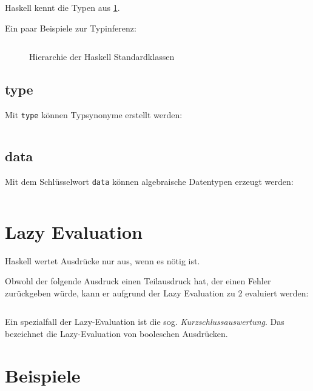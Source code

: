 Haskell kennt die Typen aus \cref{fig:haskell-type-hierarchy}.

Ein paar Beispiele zur Typinferenz:
\inputminted[numbersep=5pt, tabsize=4]{haskell}{scripts/haskell/typinferenz.sh}

\begin{figure}[htp]
    \centering
    \resizebox{0.9\linewidth}{!}{}
    \caption{Hierarchie der Haskell Standardklassen}
    \label{fig:haskell-type-hierarchy}
\end{figure}

\subsection{type}%
Mit \texttt{type} können Typsynonyme erstellt werden:

\inputminted[numbersep=5pt, tabsize=4]{haskell}{scripts/haskell/alt-types.hs}

\subsection{data}%
Mit dem Schlüsselwort \texttt{data} können algebraische Datentypen
erzeugt werden:

\inputminted[numbersep=5pt, tabsize=4]{haskell}{scripts/haskell/data-example.hs}

\section{Lazy Evaluation}
Haskell wertet Ausdrücke nur aus, wenn es nötig ist.

\begin{beispiel}
    Obwohl der folgende Ausdruck einen Teilausdruck hat, der einen Fehler zurückgeben
    würde, kann er aufgrund der Lazy Evaluation zu 2 evaluiert werden:
    \inputminted[linenos, numbersep=5pt, tabsize=4, frame=lines, label=lazy-evaluation.hs]{haskell}{scripts/haskell/lazy-evaluation.hs}
\end{beispiel}

Ein spezialfall der Lazy-Evaluation ist die sog. \textit{Kurzschlussauswertung}.
Das bezeichnet die Lazy-Evaluation von booleschen Ausdrücken.

\section{Beispiele}
